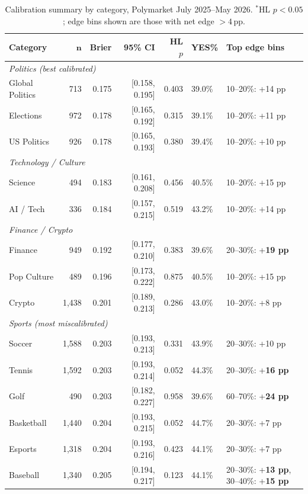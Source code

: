 \documentclass[11pt,a4paper]{article}
\begin{document}
\begin{table}[H]
\centering
\caption{Calibration summary by category, Polymarket July 2025--May 2026.
         $^*$HL $p < 0.05$; edge bins shown are those with net edge $> 4\,\mathrm{pp}$.}
\label{tab:main}
\small
\begin{tabular}{lrrrrll}
\toprule
\textbf{Category} & $\mathbf{n}$ & \textbf{Brier} & \textbf{95\% CI} & \textbf{HL $p$} & \textbf{YES\%} & \textbf{Top edge bins} \\
\midrule
\multicolumn{7}{l}{\textit{Politics (best calibrated)}} \\
Global Politics  &  713 & 0.175 & [0.158, 0.195] & 0.403 & 39.0\% & 10--20\%: +14 pp \\
Elections        &  972 & 0.178 & [0.165, 0.192] & 0.315 & 39.1\% & 10--20\%: +11 pp \\
US Politics      &  926 & 0.178 & [0.165, 0.193] & 0.380 & 39.4\% & 10--20\%: +10 pp \\
\midrule
\multicolumn{7}{l}{\textit{Technology / Culture}} \\
Science          &  494 & 0.183 & [0.161, 0.208] & 0.456 & 40.5\% & 10--20\%: +15 pp \\
AI / Tech        &  336 & 0.184 & [0.157, 0.215] & 0.519 & 43.2\% & 10--20\%: +14 pp \\
\midrule
\multicolumn{7}{l}{\textit{Finance / Crypto}} \\
Finance          &  949 & 0.192 & [0.177, 0.210] & 0.383 & 39.6\% & 20--30\%: +\textbf{19 pp} \\
Pop Culture      &  489 & 0.196 & [0.173, 0.222] & 0.875 & 40.5\% & 10--20\%: +15 pp \\
Crypto           & 1{,}438 & 0.201 & [0.189, 0.213] & 0.286 & 43.0\% & 10--20\%: +8 pp \\
\midrule
\multicolumn{7}{l}{\textit{Sports (most miscalibrated)}} \\
Soccer           & 1{,}588 & 0.203 & [0.193, 0.213] & 0.331 & 43.9\% & 20--30\%: +10 pp \\
Tennis           & 1{,}592 & 0.203 & [0.193, 0.214] & 0.052 & 44.3\% & 20--30\%: +\textbf{16 pp} \\
Golf             &  490 & 0.203 & [0.182, 0.227] & 0.958 & 39.6\% & 60--70\%: +\textbf{24 pp} \\
Basketball       & 1{,}440 & 0.204 & [0.193, 0.215] & 0.052 & 44.7\% & 20--30\%: +7 pp \\
Esports          & 1{,}318 & 0.204 & [0.193, 0.216] & 0.423 & 44.1\% & 20--30\%: +7 pp \\
Baseball         & 1{,}340 & 0.205 & [0.194, 0.217] & 0.123 & 44.1\% & 20--30\%: +\textbf{13 pp}, 30--40\%: +\textbf{15 pp} \\
\bottomrule
\end{tabular}
\end{table}
\end{document}
